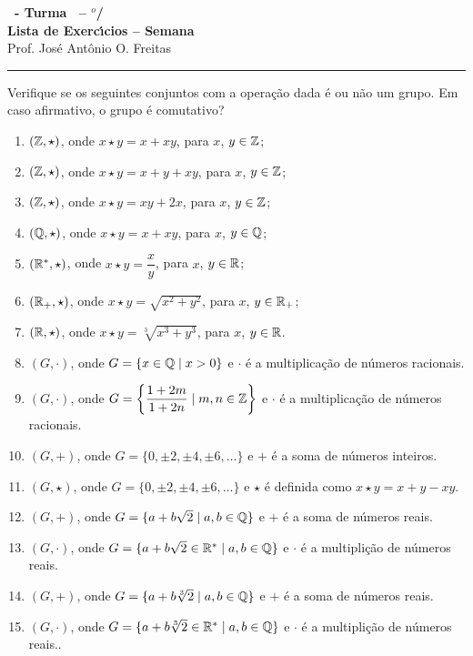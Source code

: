 \documentclass[12pt]{exam}
\begin{document}
\begin{center}
    
    {\Large\bf \disciplina\ - Turma \turma\ -- \semestre$^{o}$/\ano} \\ \vspace{9pt} {\large\bf
        Lista de Exerc{\'\i}cios -- Semana \numerosemana}\\ \vspace{9pt} Prof. Jos{\'e} Ant{\^o}nio O. Freitas
    \end{center}
    \hrule

    \vspace{.6cm}
    \questao{} Verifique se os seguintes conjuntos com a opera\c{c}\~ao dada \'e ou n\~ao um grupo. Em caso afirmativo, o grupo \'e comutativo?
    \begin{enumerate}[label=({\alph*})]
        \item $(\mathbb{Z}, \star)$, onde $x \star y = x + xy$, para $x$, $y \in \mathbb{Z}$;
        \item $(\mathbb{Z}, \star)$, onde $x \star y = x + y + xy$, para $x$, $y \in \mathbb{Z}$;
        \item $(\mathbb{Z}, \star)$, onde $x \star y = xy + 2x$, para $x$, $y \in \mathbb{Z}$;
        \item $(\mathbb{Q}, \star)$, onde $x \star y = x + xy$, para $x$, $y \in \mathbb{Q}$;
        \item $(\mathbb{R}^*, \star)$, onde $x \star y = \dfrac{x}{y}$, para $x$, $y \in \mathbb{R}$;
        \item $(\mathbb{R}_+, \star)$, onde $x \star y = \sqrt{x^2 + y^2}$, para $x$, $y \in \mathbb{R}_+$;
        \item $(\mathbb{R}, \star)$, onde $x \star y = \sqrt[3]{x^3 + y^3}$, para $x$, $y \in \mathbb{R}$.
        \item $(G, \cdot)$, onde $G = \{x \in \mathbb{Q} \mid x > 0\}$ e $\cdot$ \'e a multiplica\c{c}\~ao de n\'umeros racionais.
        \item $(G, \cdot)$, onde $G = \left\{\dfrac{1 + 2m}{1 + 2n} \mid m, n \in \mathbb{Z}\right\}$ e $\cdot$ \'e a multiplica\c{c}\~ao de n\'umeros racionais.
        \item $(G, +)$, onde $G = \{0, \pm 2, \pm 4, \pm 6, \dots\}$ e $+$ \'e a soma de n\'umeros inteiros.
        \item $(G, \star)$, onde $G = \{0, \pm 2, \pm 4, \pm 6, \dots\}$ e $\star$ \'e definida como $x \star y = x + y - xy$.
        \item $(G, +)$, onde $G = \{a + b\sqrt{2} \mid a, b \in \mathbb{Q}\}$ e $+$ \'e a soma de n\'umeros reais.
        \item $(G, \cdot)$, onde $G = \{a + b\sqrt{2} \in \mathbb{R}^* \mid a, b \in \mathbb{Q}\}$ e $\cdot$ \'e a multipli\c{c}\~ao de n\'umeros reais.
        \item $(G, +)$, onde $G = \{a + b\sqrt[3]{2} \mid a, b \in \mathbb{Q}\}$ e $+$ \'e a soma de n\'umeros reais.
        \item $(G, \cdot)$, onde $G = \{a + b\sqrt[3]{2} \in \mathbb{R}^* \mid a, b \in \mathbb{Q}\}$ e $\cdot$ \'e a multipli\c{c}\~ao de n\'umeros reais..
    \end{enumerate}
\end{document}
